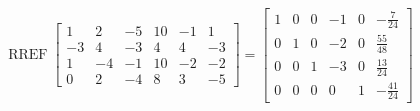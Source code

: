 \begin{exerciseAnswer} 


\[\operatorname{RREF} \left[\begin{array}{cccccc}
1 & 2 & -5 & 10 & -1 & 1 \\
-3 & 4 & -3 & 4 & 4 & -3 \\
1 & -4 & -1 & 10 & -2 & -2 \\
0 & 2 & -4 & 8 & 3 & -5
\end{array}\right] = \left[\begin{array}{cccccc}
1 & 0 & 0 & -1 & 0 & -\frac{7}{24} \\
0 & 1 & 0 & -2 & 0 & \frac{55}{48} \\
0 & 0 & 1 & -3 & 0 & \frac{13}{24} \\
0 & 0 & 0 & 0 & 1 & -\frac{41}{24}
\end{array}\right] \]



\end{exerciseAnswer}
